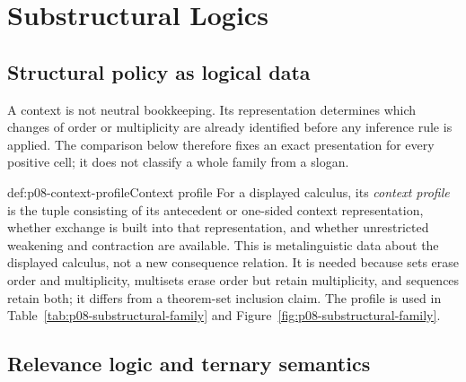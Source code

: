 
\chapter{Substructural Logics}
\label{sec:p08-substructural}

\section{Structural policy as logical data}
\label{sec:p08-substructural-policy}

A context is not neutral bookkeeping.  Its representation determines which
changes of order or multiplicity are already identified before any inference
rule is applied.  The comparison below therefore fixes an exact presentation
for every positive cell; it does not classify a whole family from a slogan.

\begin{hbdefinition}{def:p08-context-profile}{Context profile}
For a displayed calculus, its \emph{context profile} is the tuple consisting
of its antecedent or one-sided context representation, whether exchange is
built into that representation, and whether unrestricted weakening and
contraction are available.  This is metalinguistic data about the displayed
calculus, not a new consequence relation.  It is needed because sets erase
order and multiplicity, multisets erase order but retain multiplicity, and
sequences retain both; it differs from a theorem-set inclusion claim.  The
profile is used in Table~\ref{tab:p08-substructural-family} and
Figure~\ref{fig:p08-substructural-family}.
\end{hbdefinition}

\section{Relevance logic and ternary semantics}
\label{sec:p08-relevance}

